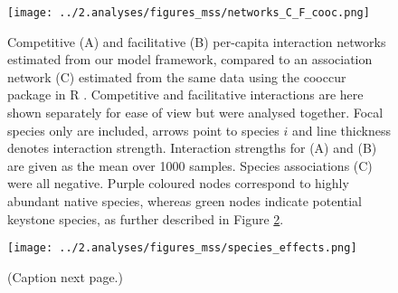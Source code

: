 \documentclass[a4,12pt]{article}
\begin{document}


    \begin{figure}[H]
        \begin{centering}
        \texttt{[image: ../2.analyses/figures\_mss/networks\_C\_F\_cooc.png]}
        \caption{Competitive (A) and facilitative (B) per-capita interaction networks estimated from our model framework, compared to an association network (C) estimated from the same data using the cooccur package in R \parencite{Griffith2016}. Competitive and facilitative interactions are here shown separately for ease of view but were analysed together. Focal species only are included, arrows point to species $i$ and line thickness denotes interaction strength. Interaction strengths for (A) and (B) are given as the mean over 1000 samples. Species associations (C) were all negative. 
        Purple coloured nodes correspond to highly abundant native species, whereas green nodes indicate potential keystone species, as further described in Figure \ref{fig:species}. }
        \label{fig:netwks}
       \end{centering}
    \end{figure}    



    \begin{figure}[H]
        \begin{centering}
        \texttt{[image: ../2.analyses/figures\_mss/species\_effects.png]}
        \caption{(Caption next page.)}
        \label{fig:species}
        \end{centering}
    \end{figure} 
\end{document}
